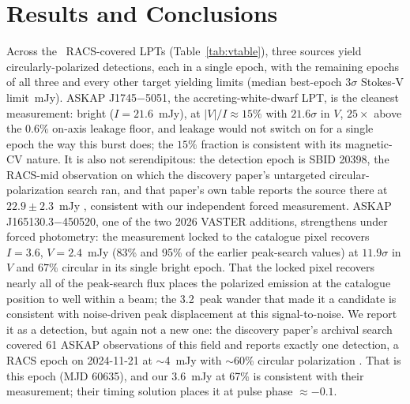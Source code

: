 \documentclass[twocolumn]{aastex631}
\begin{document}
\section{Results and Conclusions}
Across the \lvRealNMeasured\ RACS-covered LPTs (Table~\ref{tab:vtable}), three sources yield
circularly-polarized detections, each in a single epoch, with the remaining epochs of all
three and every other target yielding limits (median best-epoch $3\sigma$ Stokes-V limit
\lvRealMedianVLimit\,mJy). ASKAP
J1745$-$5051, the accreting-white-dwarf LPT, is the cleanest measurement: bright
($I=21.6$~mJy), at $|V|/I\approx15\%$ with $21.6\sigma$ in $V$, $25\times$ above the
$0.6\%$ on-axis leakage floor, and leakage would not switch on for a single epoch the way
this burst does; the $15\%$ fraction is consistent with its magnetic-CV nature. It is also
not serendipitous: the detection epoch is SBID 20398, the RACS-mid observation on which the
discovery paper's untargeted circular-polarization search ran, and that paper's own table
reports the source there at $22.9\pm2.3$~mJy \citep{rose2026}, consistent with our
independent forced measurement. ASKAP J165130.3$-$450520, one of the two 2026 VASTER
additions, strengthens under forced photometry: the measurement locked to the catalogue
pixel recovers $I=3.6$, $V=2.4$~mJy (83\% and 95\% of the earlier peak-search values) at
$11.9\sigma$ in $V$ and $67\%$ circular in its single bright epoch. That the locked pixel
recovers nearly all of the peak-search flux places the polarized emission at the catalogue
position to well within a beam; the 3.2\arcsec\ peak wander that made it a candidate is
consistent with noise-driven peak displacement at this signal-to-noise. We report it as a
detection, but again not a new one: the discovery paper's archival search covered 61
ASKAP observations of this field and reports exactly one detection, a RACS epoch on
2024-11-21 at $\sim$4~mJy with $\sim$60\% circular polarization \citep{vaster2026}. That is
this epoch (MJD 60635), and our 3.6~mJy at 67\% is consistent with their measurement; their
timing solution places it at pulse phase $\approx -0.1$.
\end{document}
